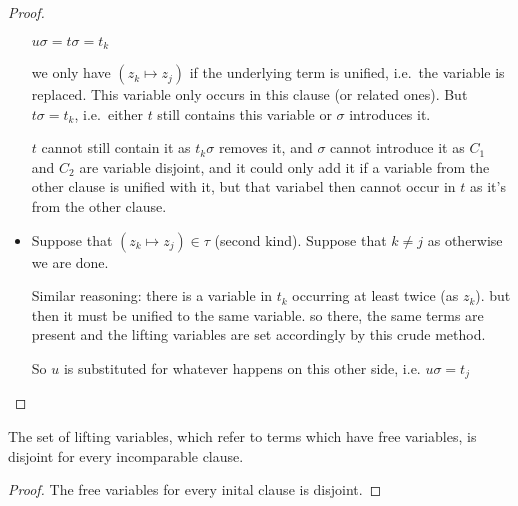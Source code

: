 \documentclass[,%
	paper=a4,%
	DIV12, %
	twoside=false,%
	liststotoc,
	bibtotoc,
	draft=false,%
	numbers=noendperiod
]{scrartcl}
\begin{document}
\begin{proof}
\begin{itemize}
				$u\sigma = t\sigma = t_k$

				we only have $(z_k \mapsto z_j)$ if the underlying term is unified, i.e.\ the variable is replaced.
				This variable only occurs in this clause (or related ones).
				But $t\sigma=t_k$, i.e.~either $t$ still contains this variable or $\sigma$ introduces it.

				$t$ cannot still contain it as $t_k\sigma$ removes it, and $\sigma$ cannot introduce it as $C_1$ and $C_2$ are variable disjoint, and it could only add it if a variable from the other clause is unified with it, but that variabel then cannot occur in $t$ as it's from the other clause.


			\item
				Suppose that $(z_k\mapsto z_j) \in \tau$ (second kind). Suppose that $k\neq j$ as otherwise we are done.

				Similar reasoning: there is a variable in $t_k$ occurring at least twice (as $z_k$).
				but then it must be unified to the same variable. so there, the same terms are present and the lifting variables are set accordingly by this crude method.

				So $u$ is substituted for whatever happens on this other side, i.e. $u\sigma = t_j$
	\end{itemize}
\end{proof}
\cbend

\begin{lemma}
	\label{lemma:disjoint_lifting_variables}
	The set of lifting variables, which refer to terms which have free variables, is disjoint for every incomparable clause.
\end{lemma}
\begin{proof}
	The free variables for every inital clause is disjoint.
\end{proof}
\end{document}
